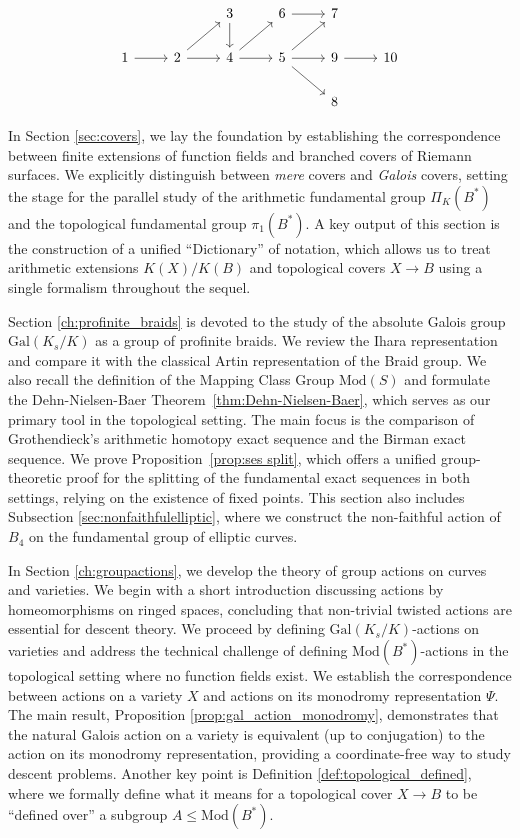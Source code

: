 \documentclass[10pt]{amsart}
\theoremstyle{definition}
\newcommand{\Gal}{{ \mathrm{Gal}}}
\begin{document}
\[\begin{tikzcd}
            &                        & 3 \arrow[d]            & 6 \arrow[r]                        & 7 \\
1 \arrow[r] & 2 \arrow[ru] \arrow[r] & 4 \arrow[r] \arrow[ru] & 5 \arrow[ru] \arrow[r] \arrow[rd] & 9 \arrow[r] & 10 \\
            &                        &                        &                                   & 8
\end{tikzcd}
\]

In Section \ref{sec:covers}, we lay the foundation by establishing the correspondence between finite extensions of function fields and branched covers of Riemann surfaces. We explicitly distinguish between \textit{mere} covers and \textit{Galois} covers, setting the stage for the parallel study of the arithmetic fundamental group $\Pi_K(B^*)$ and the topological fundamental group $\pi_1(B^*)$. A key output of this section is the construction of a unified ``Dictionary'' of notation, which allows us to treat arithmetic extensions $K(X)/K(B)$ and topological covers $X \to B$ using a single formalism throughout the sequel.

Section \ref{ch:profinite_braids} is devoted to the study of the absolute Galois group $\Gal(K_s/K)$ as a group of profinite braids. We review the Ihara representation and compare it with the classical Artin representation of the Braid group. We also recall the definition of the Mapping Class Group $\mathrm{Mod}(S)$ and formulate the Dehn-Nielsen-Baer Theorem~\ref{thm:Dehn-Nielsen-Baer}, which serves as our primary tool in the topological setting. The main focus is the comparison of Grothendieck's arithmetic homotopy exact sequence and the Birman exact sequence. We prove Proposition~\ref{prop:ses split}, which offers a unified group-theoretic proof for the splitting of the fundamental exact sequences in both settings, relying on the existence of fixed points. This section also includes Subsection \ref{sec:nonfaithfulelliptic}, where we construct the non-faithful action of $B_4$ on the fundamental group of elliptic curves.

In Section \ref{ch:groupactions}, we develop the theory of group actions on curves and varieties. We begin with a short introduction discussing actions by homeomorphisms on ringed spaces, concluding that non-trivial twisted actions are essential for descent theory. We proceed by defining $\Gal(K_s/K)$-actions on varieties and address the technical challenge of defining $\mathrm{Mod}(B^*)$-actions in the topological setting where no function fields exist. We establish the correspondence between actions on a variety $X$ and actions on its monodromy representation $\Psi$. The main result, Proposition \ref{prop:gal_action_monodromy}, demonstrates that the natural Galois action on a variety is equivalent (up to conjugation) to the action on its monodromy representation, providing a coordinate-free way to study descent problems. Another key point is Definition \ref{def:topological_defined}, where we formally define what it means for a topological cover $X \to B$ to be ``defined over'' a subgroup $A \leq \mathrm{Mod}(B^*)$.
\end{document}
